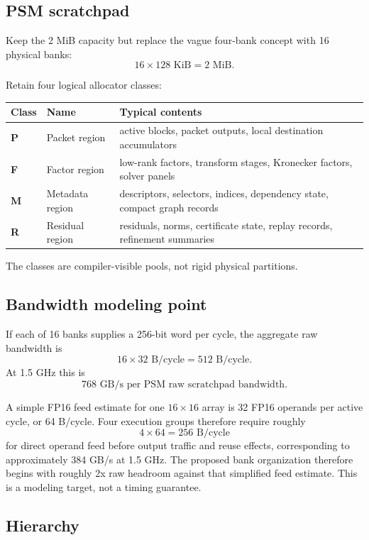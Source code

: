 \documentclass[10pt,letterpaper]{article}
\begin{document}
\subsection{PSM scratchpad}

Keep the 2 MiB capacity but replace the vague four-bank concept with 16 physical banks:
\[
16\times128\text{ KiB}=2\text{ MiB}.
\]

Retain four logical allocator classes:

\begin{table}[h]
\centering
\begin{tabularx}{0.94\linewidth}{>{\bfseries}p{0.55in}p{1.6in}X}
\toprule
Class & Name & Typical contents\\
\midrule
P & Packet region & active blocks, packet outputs, local destination accumulators\\
F & Factor region & low-rank factors, transform stages, Kronecker factors, solver panels\\
M & Metadata region & descriptors, selectors, indices, dependency state, compact graph records\\
R & Residual region & residuals, norms, certificate state, replay records, refinement summaries\\
\bottomrule
\end{tabularx}
\end{table}

The classes are compiler-visible pools, not rigid physical partitions.

\subsection{Bandwidth modeling point}

If each of 16 banks supplies a 256-bit word per cycle, the aggregate raw bandwidth is
\[
16\times 32\text{ B/cycle}=512\text{ B/cycle}.
\]
At 1.5 GHz this is
\[
\boxed{768\text{ GB/s per PSM raw scratchpad bandwidth}.}
\]

A simple FP16 feed estimate for one $16\times16$ array is 32 FP16 operands per active cycle, or 64 B/cycle. Four execution groups therefore require roughly
\[
4\times64=256\text{ B/cycle}
\]
for direct operand feed before output traffic and reuse effects, corresponding to approximately 384 GB/s at 1.5 GHz. The proposed bank organization therefore begins with roughly 2x raw headroom against that simplified feed estimate. This is a modeling target, not a timing guarantee.

\subsection{Hierarchy}
\end{document}
